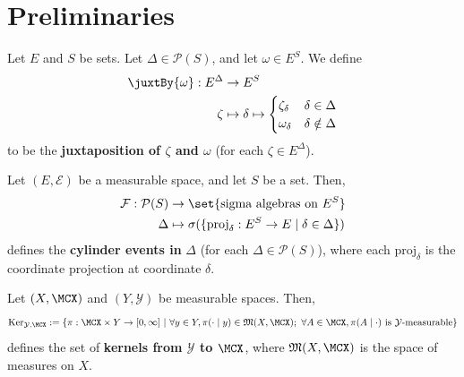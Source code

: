 \section{Preliminaries}

\begin{definition}[Juxtaposition]
    \label{def:juxtaposition}
    \leanok{}

    Let $E$ and $S$ be sets. Let $\Delta\in\mathcal{P}(S)$, and let $\omega\in E^S$. We define
    \begin{align}
        \juxtBy{\omega} : E^\Delta&\to E^S\\
        \zeta&\mapsto \delta\mapsto\begin{cases}
            \zeta_\delta & \delta\in\Delta\\
            \omega_\delta & \delta\notin\Delta
        \end{cases}
    \end{align}
    to be the \textbf{juxtaposition of $\zeta$ and $\omega$} (for each $\zeta\in E^\Delta$).
\end{definition}

\begin{definition}
    \label{def:cylinder-event}
    \leanok{}

    Let $(E,\mathcal{E})$ be a measurable space, and let $S$ be a set. Then,
    \begin{align}
        \mathcal{F}:\mathcal{P}(S)&\to \set{\text{sigma algebras on } E^S}\\
        \Delta&\mapsto \sigma(\{\text{proj}_\delta:E^S\to E\mid \delta\in \Delta\})
    \end{align}
    defines the \textbf{cylinder events in }$\Delta$ (for each $\Delta\in\mathcal{P}(S)$),
    where each $\text{proj}_\delta$ is the coordinate projection at coordinate $\delta$.
\end{definition}

\begin{definition}[Kernel]
    \label{def:kernel}
    \leanok{}

    Let $(X,\MCX)$ and $(Y,\mathcal{Y})$ be measurable spaces. Then,
    \[\text{Ker}_{\mathcal{Y},\MCX}:=\left\{\pi:\MCX\times Y\to[0,\infty]~\middle\vert~ \forall y\in Y,\pi(\cdot\mid y)\in\mathfrak{M}(X,\MCX);~\forall A\in\MCX,\pi(A\mid\cdot)\text{ is }\mathcal{Y}\text{-measurable}\right\}\]
    defines the set of \textbf{kernels from $\mathcal{Y}$ to $\MCX$}, where $\mathfrak{M}(X,\MCX)$ is the space of measures on $X$.
\end{definition}

